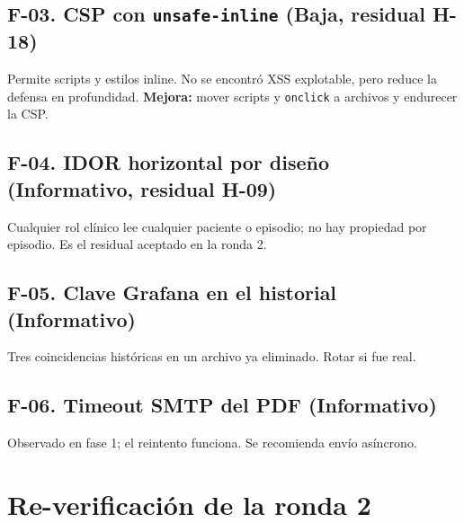\documentclass[11pt]{article}
\begin{document}
\subsection*{F-03. CSP con \texttt{unsafe-inline} (Baja, residual H-18)}

Permite scripts y estilos inline. No se encontró XSS explotable, pero reduce la
defensa en profundidad. \textbf{Mejora:} mover scripts y \texttt{onclick} a
archivos y endurecer la CSP.

\subsection*{F-04. IDOR horizontal por diseño (Informativo, residual H-09)}

Cualquier rol clínico lee cualquier paciente o episodio; no hay propiedad por
episodio. Es el residual aceptado en la ronda 2.

\subsection*{F-05. Clave Grafana en el historial (Informativo)}

Tres coincidencias históricas en un archivo ya eliminado. Rotar si fue real.

\subsection*{F-06. Timeout SMTP del PDF (Informativo)}

Observado en fase 1; el reintento funciona. Se recomienda envío asíncrono.

\section{Re-verificación de la ronda 2}
\end{document}
